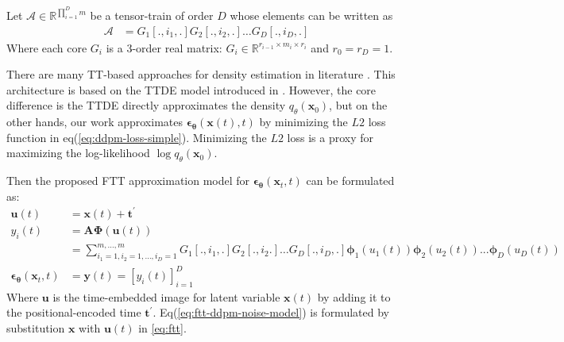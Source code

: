 \documentclass[11pt]{article}
\begin{document}
    Let $\bm{\mathscr{A}} \in \mathbb{R}^{\prod_{i=1}^{D}m}$ be a tensor-train of order $D$ whose elements can be written as
    \begin{equation}
        \label{eq:tt}
        \begin{aligned}
            \bm{\mathscr{A}} &= G_1[.,i_1,.]G_2[.,i_2,.]\dots G_D[.,i_D,.]
        \end{aligned}
    \end{equation}
    Where each core $G_i$ is a 3-order real matrix: $G_i \in \mathbb{R}^{r_{i-1}\times m_i \times r_{i}}$ and $r_0=r_D=1$.

    There are many TT-based approaches for density estimation in literature \cite{han2024tensor,novikov2022tensortrain}.
    This architecture is based on the TTDE model introduced in \cite{novikov2022tensortrain}.
    However, the core difference is the TTDE directly approximates the density $q_{\theta}(\mathbf{x}_0)$, but on the other hands,
    our work approximates $\bm{\epsilon}_{\bm{\theta}}(\mathbf{x}(t),t)$ by minimizing the $L2$ loss function in
    eq(\ref{eq:ddpm-loss-simple}). Minimizing the $L2$ loss is a proxy for maximizing the log-likelihood
    $\log q_{\theta}(\mathbf{x}_0)$.

    Then the proposed FTT approximation model for $\boldsymbol{\epsilon}_{\bm{\theta}}\left(\mathbf{x}_t, t\right)$ can be formulated as:
    \begin{subequations}
        \begin{align}
            \mathbf{u}(t)&= \mathbf{x}(t) + \mathbf{t}^{\prime} \\
            y_{i}(t) &= \mathbf{A}\bm{\Phi}(\mathbf{u}(t)) \\
            &= \sum_{i_1=1,i_2=1,\dots,i_D=1}^{m,\dots,m} G_1[.,i_1,.]G_2[.,i_2.] \dots G_D[.,i_D,.]\bm{\phi}_1(u_1(t))\bm{\phi}_2(u_2(t))...\bm{\phi}_D(u_D(t))\\
            \boldsymbol{\epsilon}_{\bm{\theta}}\left(\mathbf{x}_t, t\right) &= \mathbf{y}(t)=[y_i(t)]_{i=1}^{D}
        \end{align}
        \label{eq:ftt-ddpm-noise-model}
    \end{subequations}
    Where $\mathbf{u}$ is the time-embedded image for latent variable $\mathbf{x}(t)$ by adding it to the positional-encoded time
    $\mathbf{t}^{\prime}$.
    Eq(\ref{eq:ftt-ddpm-noise-model}) is formulated by substitution $\mathbf{x}$ with $\mathbf{u}(t)$ in \eqref{eq:ftt}.
\end{document}

